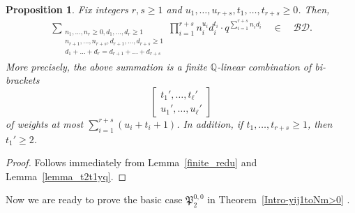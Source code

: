 \documentclass[12pt, reqno]{amsart}
\newtheorem{proposition}[theorem]{Proposition}
\theoremstyle{definition}
\theoremstyle{remark}
\numberwithin{equation}{section}
\newcommand{\BD}{\mathcal {BD}}
\newcommand{\Q}{ \mathbb Q }
\numberwithin{equation}{section}
\begin{document}
\begin{proposition}  \label{Prop_t2t1yq} 
Fix integers $r, s \ge 1$ and $u_1, \ldots, u_{r+s}, 
t_1, \ldots, t_{r+s} \ge 0$. Then, 
\begin{eqnarray}  \label{Prop_t2t1yq.0}
\sum_{\substack{n_1, \ldots, n_r \ge 0, d_1, \ldots, d_r \ge 1\\
    n_{r+1}, \ldots, n_{r+s}, d_{r+1}, \ldots, d_{r+s} \ge 1\\
    d_1+ \ldots + d_r = d_{r+1} + \ldots + d_{r+s}}}
  \prod_{i=1}^{r+s} n_i^{u_i}d_i^{t_i} \cdot q^{\sum_{i=1}^{r+s} n_i d_i}
\quad \in \quad \BD.
\end{eqnarray}
More precisely, the above summation is a finite $\Q$-linear combination of 
bi-brackets
$$
\begin{bmatrix} t_1', \ldots, t_\ell'\\u_1', \ldots, u_\ell' \end{bmatrix}
$$
of weights at most $\sum_{i=1}^{r+s} (u_i + t_i+1)$. In addition, 
if $t_1, \ldots, t_{r+s} \ge 1$, then $t_1' \ge 2$. 
\end{proposition}
\begin{proof}
Follows immediately from Lemma~\ref{finite_redu} and 
Lemma~\ref{lemma_t2t1yq}.
\end{proof}

Now we are ready to prove the basic case $\mathfrak P_{2}^{0,0}$ in 
Theorem~\ref{Intro-yij1toNm>0} .
\end{document}
